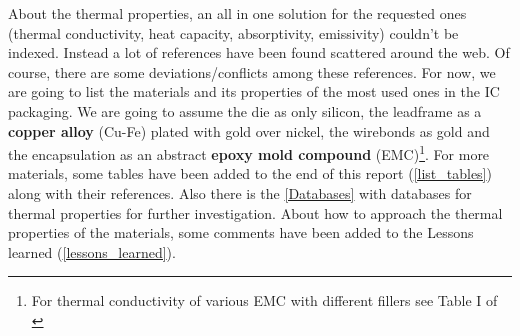 \documentclass[final]{cubedoc}
\begin{document}
	
	
	About the thermal properties, an all in one solution for the requested ones (thermal conductivity, heat capacity, absorptivity, emissivity) couldn't be indexed. Instead a lot of references have been found scattered around the web. Of course, there are some deviations/conflicts among these references. For now, we are going to list the materials and its properties of the most used ones in the IC packaging. We are going to assume the die as only silicon, the leadframe as a \textbf{copper alloy} (Cu-Fe) plated with gold over nickel, the wirebonds as gold and the encapsulation as an abstract \textbf{epoxy mold compound} (EMC)\footnote{For thermal conductivity of various EMC with different fillers see Table I of \cite{Cheng2018StudyOT}}. For more materials, some tables have been added to the end of this report (\cref{list_tables}) along with their references. Also there is the \cref{Databases} with databases for thermal properties for further investigation. About how to approach the thermal properties of the materials, some comments have been added to the Lessons learned (\cref{lessons_learned}).
	
\end{document}
